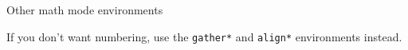 \documentclass{beamer}
\begin{document}
\begin{frame}{Other math mode environments}
{\begin{center}
            \end{center}
            If you don't want numbering, use the \texttt{gather*} and \texttt{align*} environments instead.
        }
    \end{frame}
\end{document}
